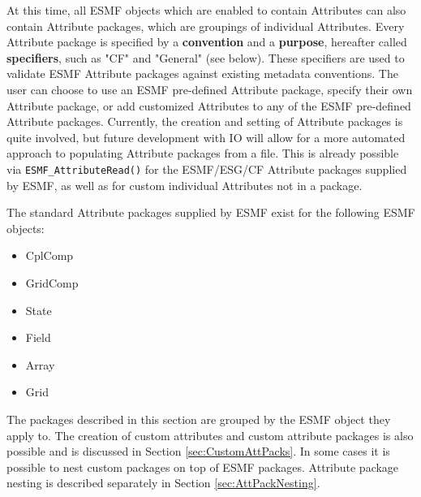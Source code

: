 %


\label{sec:AttPacks}

At this time, all ESMF objects which are enabled to contain Attributes can also contain Attribute packages, which are groupings of individual Attributes.  Every Attribute package is specified by a {\bf convention} and a {\bf purpose}, hereafter called {\bf specifiers}, such as "CF" and "General" (see below).  These specifiers are used to validate ESMF Attribute packages against existing metadata conventions.  The user can choose to use an ESMF pre-defined Attribute package, specify their own Attribute package, or add customized Attributes to any of the ESMF pre-defined Attribute packages. Currently, the creation and setting of Attribute packages is quite involved, but future development with IO will allow for a more automated approach to populating Attribute packages from a file.  This is already possible via {\tt ESMF\_AttributeRead()} for the ESMF/ESG/CF Attribute packages supplied by ESMF, as well as for custom individual Attributes not in a package.

The standard Attribute packages supplied by ESMF exist for the following ESMF objects:

\begin{itemize}
    \item CplComp
    \item GridComp
    \item State
    \item Field
    \item Array
    \item Grid
\end{itemize}

The packages described in this section are grouped by the ESMF object they apply to. The creation of custom attributes and custom attribute packages is also possible and is discussed in Section \ref{sec:CustomAttPacks}. In some cases it is possible to nest custom packages on top of ESMF packages. Attribute package nesting is described separately in Section \ref{sec:AttPackNesting}.

